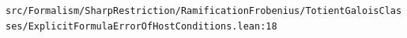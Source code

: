 \nolinkurl{src/Formalism/SharpRestriction/RamificationFrobenius/TotientGaloisClasses/ExplicitFormulaErrorOfHostConditions.lean:18}%
